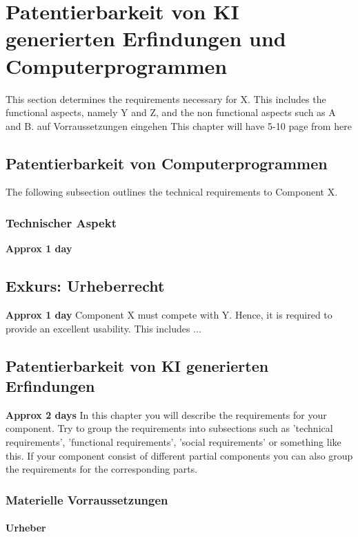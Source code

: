 \chapter{Patentierbarkeit von KI generierten Erfindungen und Computerprogrammen\label{cha:chapter3}}
This section determines the requirements necessary for X. This includes the functional aspects, namely Y and Z, and the non functional aspects such as A and B.
auf Vorraussetzungen eingehen 
This chapter will have 5-10 page from here
\section{Patentierbarkeit von Computerprogrammen\label{sec:patcom}}


The following subsection outlines the technical requirements to Component X.

\subsection{Technischer Aspekt\label{sec:reqsuba}}

\textbf{Approx 1 day}

\section{Exkurs: Urheberrecht\label{sec:urh}}

\textbf{Approx 1 day}
Component X must compete with Y. Hence, it is required to provide an excellent usability. This includes ...
\section{Patentierbarkeit von KI generierten Erfindungen\label{sec:reqoverview}}

\textbf{Approx 2 days}
In this chapter you will describe the requirements for your component. Try to group the requirements into subsections such as 'technical requirements', 'functional requirements', 'social requirements' or something like this. If your component consist of different partial components you can also group the requirements for the corresponding parts. 

\subsection{Materielle Vorraussetzungen\label{sec:matvor}}

\subsubsection{Urheber}

